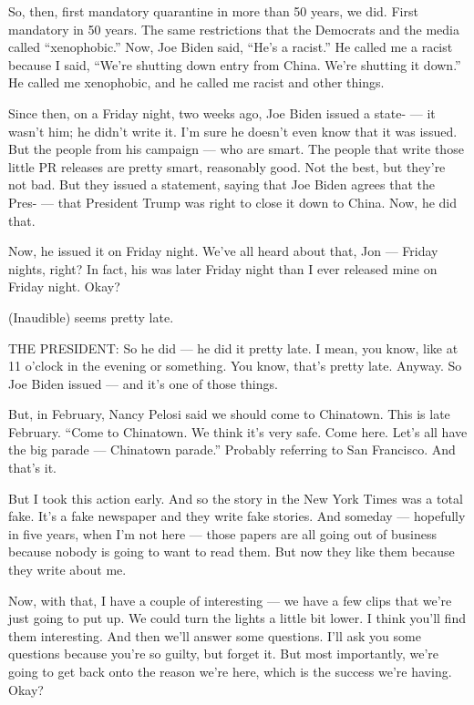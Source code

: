 So, then, first mandatory quarantine in more than 50 years, we did.
First mandatory in 50 years. The same restrictions that the Democrats
and the media called ``xenophobic.'' Now, Joe Biden said, ``He's a
racist.'' He called me a racist because I said, ``We're shutting down
entry from China. We're shutting it down.'' He called me xenophobic, and
he called me racist and other things.

Since then, on a Friday night, two weeks ago, Joe Biden issued a state-
--- it wasn't him; he didn't write it. I'm sure he doesn't even know
that it was issued. But the people from his campaign --- who are smart.
The people that write those little PR releases are pretty smart,
reasonably good. Not the best, but they're not bad. But they issued a
statement, saying that Joe Biden agrees that the Pres- --- that
President Trump was right to close it down to China. Now, he did that.

Now, he issued it on Friday night. We've all heard about that, Jon ---
Friday nights, right? In fact, his was later Friday night than I ever
released mine on Friday night. Okay?

(Inaudible) seems pretty late.

THE PRESIDENT: So he did --- he did it pretty late. I mean, you know,
like at 11 o'clock in the evening or something. You know, that's pretty
late. Anyway. So Joe Biden issued --- and it's one of those things.

But, in February, Nancy Pelosi said we should come to Chinatown. This is
late February. ``Come to Chinatown. We think it's very safe. Come here.
Let's all have the big parade --- Chinatown parade.'' Probably referring
to San Francisco. And that's it.

But I took this action early. And so the story in the New York Times was
a total fake. It's a fake newspaper and they write fake stories. And
someday --- hopefully in five years, when I'm not here --- those papers
are all going out of business because nobody is going to want to read
them. But now they like them because they write about me.

Now, with that, I have a couple of interesting --- we have a few clips
that we're just going to put up. We could turn the lights a little bit
lower. I think you'll find them interesting. And then we'll answer some
questions. I'll ask you some questions because you're so guilty, but
forget it. But most importantly, we're going to get back onto the reason
we're here, which is the success we're having. Okay?

